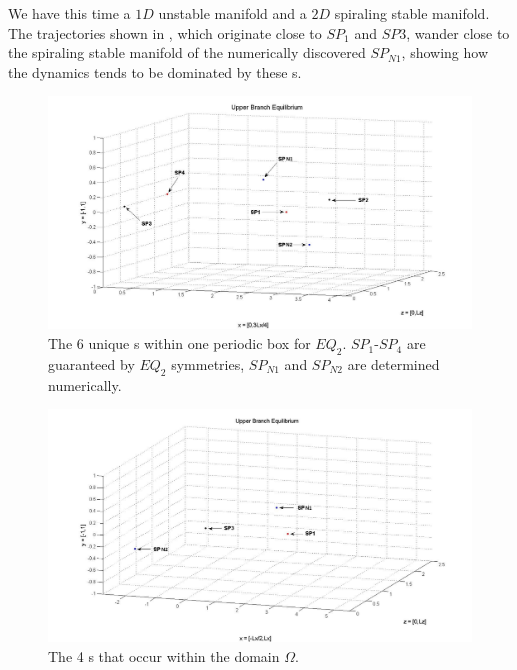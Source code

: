 \documentclass[lineno]{jfm}
\begin{document}
We have this time a $1D$ unstable manifold and a $2D$ spiraling stable 
manifold. The trajectories shown in , which 
originate close to $SP_1$ and $SP3$, wander close to the spiraling stable 
manifold of the numerically discovered $SP_{N1}$, showing how the 
dynamics tends to be dominated by these {\stagp}s. 

 \begin{figure}[!h]
\includegraphics[width=1.0\textwidth]{stagps_edited.jpg}
  \caption{
   The 6 unique \stagp s within one periodic box for $EQ_2$. 
   $SP_1$-$SP_4$ are guaranteed by $EQ_2$ symmetries, $SP_{N1}$ and 
   $SP_{N2}$ are determined numerically. 
   }
  \label{fig:stagps_label}
 \end{figure}

 \begin{figure}[!h]
\includegraphics[width=1.0\textwidth]{stagps2_edited.jpg}
  \caption{
   The 4 \stagp s that occur within the domain $\Omega$.
   }
  \label{fig:stagps_label2}
 \end{figure}
\end{document}
